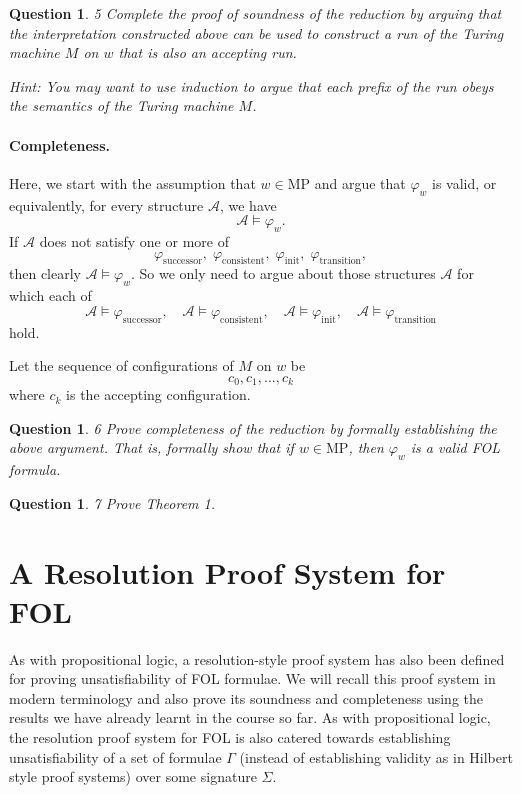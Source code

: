 \documentclass{article}
\newtheorem{question}[theorem]{Question}
\begin{document}
\begin{question}{5}
Complete the proof of soundness of the reduction by arguing that the interpretation constructed above can be used to construct a run of the Turing machine $M$ on $w$ that is also an accepting run.

\emph{Hint:} You may want to use induction to argue that each prefix of the run obeys the semantics of the Turing machine $M$.
\end{question}

\paragraph{Completeness.}
Here, we start with the assumption that $w\in \mathrm{MP}$ and argue that $\varphi_w$ is valid, or equivalently, for every structure $\mathcal{A}$, we have
\[
\mathcal{A}\models \varphi_w.
\]
If $\mathcal{A}$ does not satisfy one or more of
\[
\varphi_{\mathrm{successor}},\;
\varphi_{\mathrm{consistent}},\;
\varphi_{\mathrm{init}},\;
\varphi_{\mathrm{transition}},
\]
then clearly $\mathcal{A}\models \varphi_w$. So we only need to argue about those structures $\mathcal{A}$ for which each of
\[
\mathcal{A}\models \varphi_{\mathrm{successor}},\quad
\mathcal{A}\models \varphi_{\mathrm{consistent}},\quad
\mathcal{A}\models \varphi_{\mathrm{init}},\quad
\mathcal{A}\models \varphi_{\mathrm{transition}}
\]
hold.

Let the sequence of configurations of $M$ on $w$ be
\[
c_0,c_1,\dots,c_k
\]
where $c_k$ is the accepting configuration.

\begin{question}{6}
Prove completeness of the reduction by formally establishing the above argument. That is, formally show that if $w \in \mathrm{MP}$, then $\varphi_w$ is a valid FOL formula.
\end{question}

\begin{question}{7}
Prove Theorem 1.
\end{question}

\section*{A Resolution Proof System for FOL}

As with propositional logic, a resolution-style proof system has also been defined for proving unsatisfiability of FOL formulae. We will recall this proof system in modern terminology and also prove its soundness and completeness using the results we have already learnt in the course so far. As with propositional logic, the resolution proof system for FOL is also catered towards establishing unsatisfiability of a set of formulae $\Gamma$ (instead of establishing validity as in Hilbert style proof systems) over some signature $\Sigma$.
\end{document}
